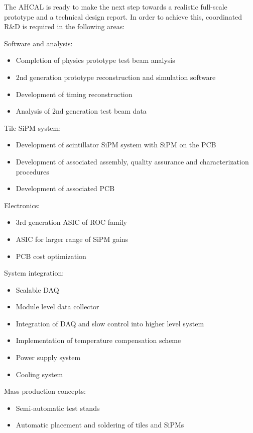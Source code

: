 The AHCAL is ready to make the next step towards a realistic full-scale prototype and a technical design report. In order to achieve this, coordinated R\&D is required in the following areas:

Software and analysis:
\begin{itemize}
\item Completion of physics prototype test beam analysis
\item 2nd generation prototype reconstruction and simulation software
\item Development of timing reconstruction
\item Analysis of 2nd generation test beam data
\end{itemize}

Tile SiPM system:
\begin{itemize}
\item Development of scintillator SiPM system with SiPM on the PCB
\item Development of associated assembly, quality assurance and characterization procedures
\item Development of associated PCB
\end{itemize}

Electronics:
\begin{itemize}
\item 3rd generation ASIC of ROC family
\item ASIC for larger range of SiPM gains
\item PCB cost optimization
\end{itemize}

System integration:
\begin{itemize}
\item Scalable DAQ
\item Module level data collector
\item Integration of DAQ and slow control into higher level system
\item Implementation of temperature compensation scheme
\item Power supply system
\item Cooling system
\end{itemize}

Mass production concepts:
\begin{itemize}
\item Semi-automatic test stands
\item Automatic placement and soldering of tiles and SiPMs
\end{itemize}

